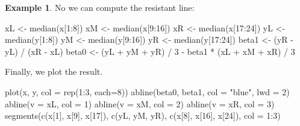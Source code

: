 \documentclass[
  a4paper,
]{article}
\newenvironment{Shaded}{\begin{snugshade}}{\end{snugshade}}
\newcommand{\AttributeTok}[1]{\textcolor[rgb]{0.77,0.63,0.00}{#1}}
\newcommand{\DecValTok}[1]{\textcolor[rgb]{0.00,0.00,0.81}{#1}}
\newcommand{\FunctionTok}[1]{\textcolor[rgb]{0.00,0.00,0.00}{#1}}
\newcommand{\NormalTok}[1]{#1}
\newcommand{\OtherTok}[1]{\textcolor[rgb]{0.56,0.35,0.01}{#1}}
\newcommand{\SpecialCharTok}[1]{\textcolor[rgb]{0.00,0.00,0.00}{#1}}
\newcommand{\StringTok}[1]{\textcolor[rgb]{0.31,0.60,0.02}{#1}}
\theoremstyle{definition}
\theoremstyle{definition}
\newtheorem{example}{Example}[section]
\theoremstyle{definition}
\theoremstyle{definition}
\theoremstyle{remark}
\begin{document}
\begin{example}
No we can compute the resistant line:

\begin{Shaded}
\begin{Highlighting}[]
\NormalTok{xL }\OtherTok{\textless{}{-}} \FunctionTok{median}\NormalTok{(x[}\DecValTok{1}\SpecialCharTok{:}\DecValTok{8}\NormalTok{])}
\NormalTok{xM }\OtherTok{\textless{}{-}} \FunctionTok{median}\NormalTok{(x[}\DecValTok{9}\SpecialCharTok{:}\DecValTok{16}\NormalTok{])}
\NormalTok{xR }\OtherTok{\textless{}{-}} \FunctionTok{median}\NormalTok{(x[}\DecValTok{17}\SpecialCharTok{:}\DecValTok{24}\NormalTok{])}
\NormalTok{yL }\OtherTok{\textless{}{-}} \FunctionTok{median}\NormalTok{(y[}\DecValTok{1}\SpecialCharTok{:}\DecValTok{8}\NormalTok{])}
\NormalTok{yM }\OtherTok{\textless{}{-}} \FunctionTok{median}\NormalTok{(y[}\DecValTok{9}\SpecialCharTok{:}\DecValTok{16}\NormalTok{])}
\NormalTok{yR }\OtherTok{\textless{}{-}} \FunctionTok{median}\NormalTok{(y[}\DecValTok{17}\SpecialCharTok{:}\DecValTok{24}\NormalTok{])}
\NormalTok{beta1 }\OtherTok{\textless{}{-}}\NormalTok{ (yR }\SpecialCharTok{{-}}\NormalTok{ yL) }\SpecialCharTok{/}\NormalTok{ (xR }\SpecialCharTok{{-}}\NormalTok{ xL)}
\NormalTok{beta0 }\OtherTok{\textless{}{-}}\NormalTok{ (yL }\SpecialCharTok{+}\NormalTok{ yM }\SpecialCharTok{+}\NormalTok{ yR) }\SpecialCharTok{/} \DecValTok{3} \SpecialCharTok{{-}}\NormalTok{ beta1 }\SpecialCharTok{*}\NormalTok{ (xL }\SpecialCharTok{+}\NormalTok{ xM }\SpecialCharTok{+}\NormalTok{ xR) }\SpecialCharTok{/} \DecValTok{3}
\end{Highlighting}
\end{Shaded}

Finally, we plot the result.

\begin{Shaded}
\begin{Highlighting}[]
\FunctionTok{plot}\NormalTok{(x, y, }\AttributeTok{col =} \FunctionTok{rep}\NormalTok{(}\DecValTok{1}\SpecialCharTok{:}\DecValTok{3}\NormalTok{, }\AttributeTok{each=}\DecValTok{8}\NormalTok{))}
\FunctionTok{abline}\NormalTok{(beta0, beta1, }\AttributeTok{col =} \StringTok{"blue"}\NormalTok{, }\AttributeTok{lwd =} \DecValTok{2}\NormalTok{)}
\FunctionTok{abline}\NormalTok{(}\AttributeTok{v =}\NormalTok{ xL, }\AttributeTok{col =} \DecValTok{1}\NormalTok{)}
\FunctionTok{abline}\NormalTok{(}\AttributeTok{v =}\NormalTok{ xM, }\AttributeTok{col =} \DecValTok{2}\NormalTok{)}
\FunctionTok{abline}\NormalTok{(}\AttributeTok{v =}\NormalTok{ xR, }\AttributeTok{col =} \DecValTok{3}\NormalTok{)}
\FunctionTok{segments}\NormalTok{(}\FunctionTok{c}\NormalTok{(x[}\DecValTok{1}\NormalTok{], x[}\DecValTok{9}\NormalTok{], x[}\DecValTok{17}\NormalTok{]), }\FunctionTok{c}\NormalTok{(yL, yM, yR), }\FunctionTok{c}\NormalTok{(x[}\DecValTok{8}\NormalTok{], x[}\DecValTok{16}\NormalTok{], x[}\DecValTok{24}\NormalTok{]),}
         \AttributeTok{col =} \DecValTok{1}\SpecialCharTok{:}\DecValTok{3}\NormalTok{)}
\end{Highlighting}
\end{Shaded}


\end{example}
\end{document}
